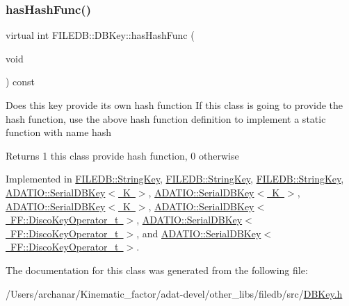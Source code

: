 \mbox{\label{classFILEDB_1_1DBKey_a541dab4f4083ae951dee2f30483eb18e}} 
\subsubsection{\texorpdfstring{hasHashFunc()}{hasHashFunc()}\hspace{0.1cm}{\footnotesize\ttfamily [3/3]}}
{\footnotesize\ttfamily virtual int F\+I\+L\+E\+D\+B\+::\+D\+B\+Key\+::has\+Hash\+Func (\begin{DoxyParamCaption}\item[{void}]{ }\end{DoxyParamCaption}) const\hspace{0.3cm}{\ttfamily [pure virtual]}}

Does this key provide its own hash function If this class is going to provide the hash function, use the above hash function definition to implement a static function with name hash

\begin{DoxyReturn}{Returns}
1 this class provide hash function, 0 otherwise 
\end{DoxyReturn}


Implemented in \mbox{\hyperlink{classFILEDB_1_1StringKey_afb2fa99d53c0f4b5aeca0377228ea722}{F\+I\+L\+E\+D\+B\+::\+String\+Key}}, \mbox{\hyperlink{classFILEDB_1_1StringKey_afb2fa99d53c0f4b5aeca0377228ea722}{F\+I\+L\+E\+D\+B\+::\+String\+Key}}, \mbox{\hyperlink{classFILEDB_1_1StringKey_afb2fa99d53c0f4b5aeca0377228ea722}{F\+I\+L\+E\+D\+B\+::\+String\+Key}}, \mbox{\hyperlink{classADATIO_1_1SerialDBKey_ae8926cd9bdef006f3729f4b724a2e2fe}{A\+D\+A\+T\+I\+O\+::\+Serial\+D\+B\+Key$<$ K $>$}}, \mbox{\hyperlink{classADATIO_1_1SerialDBKey_ae8926cd9bdef006f3729f4b724a2e2fe}{A\+D\+A\+T\+I\+O\+::\+Serial\+D\+B\+Key$<$ K $>$}}, \mbox{\hyperlink{classADATIO_1_1SerialDBKey_ae8926cd9bdef006f3729f4b724a2e2fe}{A\+D\+A\+T\+I\+O\+::\+Serial\+D\+B\+Key$<$ K $>$}}, \mbox{\hyperlink{classADATIO_1_1SerialDBKey_ae8926cd9bdef006f3729f4b724a2e2fe}{A\+D\+A\+T\+I\+O\+::\+Serial\+D\+B\+Key$<$ F\+F\+::\+Disco\+Key\+Operator\+\_\+t $>$}}, \mbox{\hyperlink{classADATIO_1_1SerialDBKey_ae8926cd9bdef006f3729f4b724a2e2fe}{A\+D\+A\+T\+I\+O\+::\+Serial\+D\+B\+Key$<$ F\+F\+::\+Disco\+Key\+Operator\+\_\+t $>$}}, and \mbox{\hyperlink{classADATIO_1_1SerialDBKey_ae8926cd9bdef006f3729f4b724a2e2fe}{A\+D\+A\+T\+I\+O\+::\+Serial\+D\+B\+Key$<$ F\+F\+::\+Disco\+Key\+Operator\+\_\+t $>$}}.



The documentation for this class was generated from the following file\+:\begin{DoxyCompactItemize}
\item 
/\+Users/archanar/\+Kinematic\+\_\+factor/adat-\/devel/other\+\_\+libs/filedb/src/\mbox{\hyperlink{adat-devel_2other__libs_2filedb_2src_2DBKey_8h}{D\+B\+Key.\+h}}\end{DoxyCompactItemize}
